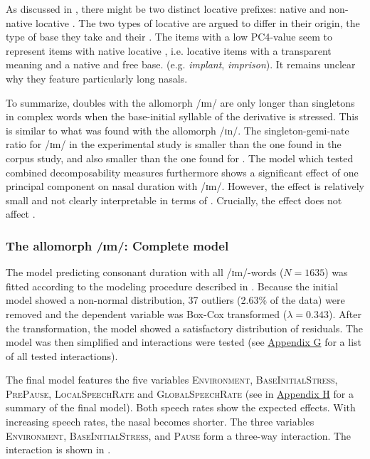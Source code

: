 As discussed in , there might be two distinct locative prefixes: native and non-native locative . The two types of locative  are argued to differ in their origin, the type of base they take and their . The items with a low \textsc{PC4}-value seem to represent items with native locative , i.e. locative items with a transparent meaning and a native and free base. (e.g. \textit{implant}, \textit{imprison}). It remains unclear why they feature particularly long nasals.



To summarize,  doubles with the allomorph /ɪm/  are only longer than singletons in complex words when the base-initial syllable of the derivative is stressed. This is similar to what was found with the allomorph /ɪn/. The singleton-gemi-nate ratio for /ɪm/  in the experimental study is smaller than the one found in the corpus study, and also smaller than the one found for . 
The model which tested combined decomposability measures furthermore shows a significant effect of one principal component on nasal duration with /ɪm/. However, the effect is relatively small and not clearly interpretable in terms of . Crucially, the effect does not affect .




\subsubsection{The allomorph /ɪm/: Complete model}

The model predicting consonant duration with all /ɪm/-words ($N=1635$) was fitted according to the modeling procedure described in .  Because the initial model showed a non-normal distribution,  37 outliers (2.63\% of the data) were removed and the dependent variable was Box-Cox transformed ($\lambda = 0.343$). 
After the transformation, the model showed a satisfactory distribution of residuals. The model was then simplified and interactions were tested (see \hyperref[Appendix G Summaries of tested interactions in experimental study]{Appendix G} for a list of all tested interactions). 

 
The final model features the five variables \textsc{Environment}, \textsc{BaseInitialStress}, \textsc{PrePause}, \textsc{LocalSpeechRate} and \textsc{GlobalSpeechRate} (see  in \hyperref[Appendix H: Model Summaries Experiment]{Appen\-dix H} for a summary of the final model). Both speech rates show the expected effects. With increasing speech rates, the nasal becomes shorter. The three variables \textsc{Environment}, \textsc{BaseInitialStress}, and \textsc{Pause} form a three-way interaction. The interaction is shown in .

